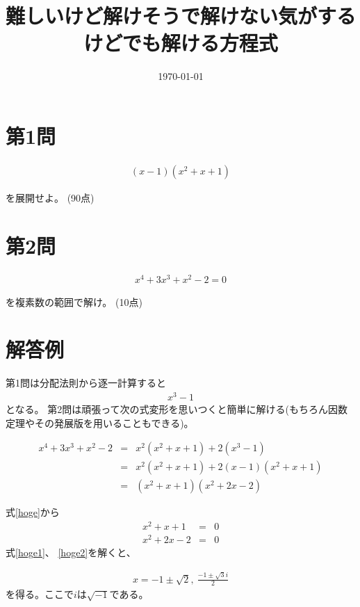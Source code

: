 \documentclass[11pt,a4paper]{jsarticle}
\title{難しいけど解けそうで解けない気がするけどでも解ける方程式}
\date{\today}
\begin{document}
\maketitle

\section*{第1問}

\begin{eqnarray}
    (x-1)(x^2+x+1)
\end{eqnarray}

を展開せよ。
(90点)

\section*{第2問}

\begin{eqnarray}
    x^4+3x^3+x^2-2=0
\end{eqnarray}

を複素数の範囲で解け。
(10点)

\newpage
\section*{解答例}
第1問は分配法則から逐一計算すると
\begin{eqnarray}
    x^3-1 \nonumber
\end{eqnarray}
となる。
第2問は頑張って次の式変形を思いつくと簡単に解ける(もちろん因数定理やその発展版を用いることもできる)。

\begin{eqnarray}
    x^4+3x^3+x^2-2&=&x^2(x^2+x+1)+2(x^3-1) \nonumber \\ 
    &=&x^2(x^2+x+1)+2(x-1)(x^2+x+1) \nonumber \\
    \label{hoge}
    &=&(x^2+x+1)(x^2+2x-2)
\end{eqnarray}

式\ref{hoge}から
\begin{eqnarray}
    \label{hoge1}
    x^2+x+1&=&0\\
    \label{hoge2}
    x^2+2x-2&=&0
\end{eqnarray}
式\ref{hoge1}、 \ref{hoge2}を解くと、

\begin{eqnarray}
    x=-1\pm \sqrt{2},\ \frac{-1\pm \sqrt{3}i}{2} \nonumber
\end{eqnarray}
を得る。ここで$i$は$\sqrt{-1}$である。
\end{document}
